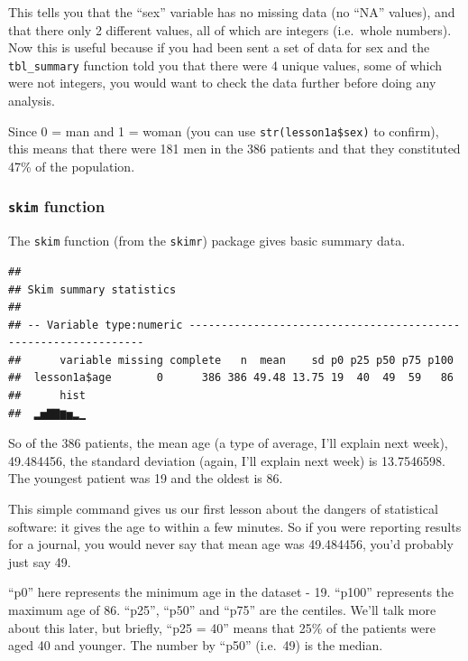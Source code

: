\documentclass[]{book}
\newenvironment{Shaded}{\begin{snugshade}}{\end{snugshade}}
\newcommand{\KeywordTok}[1]{\textcolor[rgb]{0.13,0.29,0.53}{\textbf{#1}}}
\newcommand{\NormalTok}[1]{#1}
\newcommand{\OperatorTok}[1]{\textcolor[rgb]{0.81,0.36,0.00}{\textbf{#1}}}
\begin{document}
This tells you that the ``sex'' variable has no missing data (no ``NA''
values), and that there only 2 different values, all of which are
integers (i.e.~whole numbers). Now this is useful because if you had
been sent a set of data for sex and the \texttt{tbl\_summary} function
told you that there were 4 unique values, some of which were not
integers, you would want to check the data further before doing any
analysis.

Since 0 = man and 1 = woman (you can use \texttt{str(lesson1a\$sex)} to
confirm), this means that there were 181 men in the 386 patients and
that they constituted 47\% of the population.

\hypertarget{skim-function-1}{%
\subsubsection{\texorpdfstring{\texttt{skim}
function}{skim function}}\label{skim-function-1}}

The \texttt{skim} function (from the \texttt{skimr}) package gives basic
summary data.

\begin{Shaded}
\end{Shaded}

\begin{verbatim}
## 
## Skim summary statistics
## 
## -- Variable type:numeric ---------------------------------------------------------------
##      variable missing complete   n  mean    sd p0 p25 p50 p75 p100
##  lesson1a$age       0      386 386 49.48 13.75 19  40  49  59   86
##      hist
##  ▂▅▇▇▆▅▂▁
\end{verbatim}

So of the 386 patients, the mean age (a type of average, I'll explain
next week), 49.484456, the standard deviation (again, I'll explain next
week) is 13.7546598. The youngest patient was 19 and the oldest is 86.

This simple command gives us our first lesson about the dangers of
statistical software: it gives the age to within a few minutes. So if
you were reporting results for a journal, you would never say that mean
age was 49.484456, you'd probably just say 49.

``p0'' here represents the minimum age in the dataset - 19. ``p100''
represents the maximum age of 86. ``p25'', ``p50'' and ``p75'' are the
centiles. We'll talk more about this later, but briefly, ``p25 = 40''
means that 25\% of the patients were aged 40 and younger. The number by
``p50'' (i.e.~49) is the median.
\end{document}
